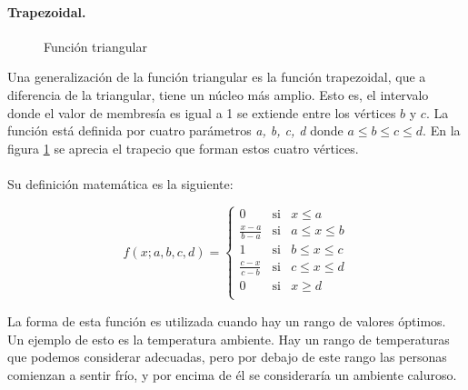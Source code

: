 \paragraph{Trapezoidal.}
\begin{figure}
	\captionsetup{margin=1cm,justification=centering}	
	\caption{Función triangular}
	\label{fig:trapmf}
\end{figure}

Una generalización de la función triangular es la función trapezoidal, que a diferencia de la triangular, tiene un núcleo más amplio. Esto es, el intervalo donde el valor de membresía es igual a 1 se extiende entre los vértices
$b$ y $c$.
La función está definida por cuatro parámetros \textit{a, b, c, d} donde $ a \leq b \leq c \leq  d$. En la figura \ref{fig:trapmf} se aprecia el trapecio que forman estos cuatro vértices.\\\\
Su definición matemática es la siguiente:

$$  f(x;a,b,c,d)= \left\lbrace \begin{array}{lcl}
						0		& \mbox{si} & x  \leq a \\ [.30cm]
{\displaystyle \frac{x-a}{b-a}} & \mbox{si} & a \leq x \leq b \\ [.45cm]
						1		& \mbox{si} & b \leq x \leq c \\ [.30cm]
{\displaystyle \frac{c-x}{c-b}} & \mbox{si} & c \leq x \leq d \\ [.45cm]
						0 		& \mbox{si} & x \geq d \\
\end{array}
\right.
$$

La forma de esta función es utilizada cuando hay un rango de valores óptimos. Un ejemplo de esto es la temperatura ambiente. Hay un rango de temperaturas que podemos considerar adecuadas, pero por debajo de este rango las personas comienzan a sentir frío, y por encima de él se consideraría un ambiente caluroso.


